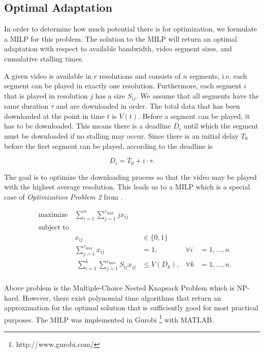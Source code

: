 \subsection{Optimal Adaptation}
\label{optadapt}

In order to determine how much potential there is for optimization, we formulate a MILP for this problem. 
The solution to the MILP will return an optimal adaptation with respect to available bandwidth, video segment sizes, and cumulative stalling times.

A given video is available in $r$ resolutions and consists of $n$ segments, i.e. each segment can be played in exactly one resolution. Furthermore, each segment $i$ that is played in resolution $j$ has a size $S_{ij}$. We assume that all segments have the same duration $\tau$ and are downloaded in order. The total data that has been downloaded at the point in time $t$ is $V(t)$. Before a segment can be played, it has to be downloaded. This means there is a deadline $D_i$ until which the segment must be downloaded if no stalling may occur. Since there is an initial delay $T_0$ before the first segment can be played, according to \cite{hossfeld2015identifying} the deadline is

\begin{equation}
D_i = T_0 + i\cdot \tau.
\end{equation}

The goal is to optimize the downloading process so that the video may be played with the highest average resolution. This leads us to a MILP which is a special case of \textit{Optimization Problem 2} from \cite{hossfeld2015identifying}.

\begin{align*}
& \text{maximize} & \sum_{i = 1}^{n} \sum_{j = 1}^{r_{\text{max}}} j x_{ij} &\\
& \text{subject to} & &&\\
&& x_{ij} &\in \{0,1\} &\\
&& \sum_{j = 1}^{r_{\text{max}}} x_{ij} &= 1, &\forall i&=1,\ldots,n \\
&& \phantom{\text{.}} \sum_{i=1}^{k} \sum_{j = 1}^{r_{\text{max}}} S_{ij} x_{ij} &\leq V(D_k), &\forall k&=1,\ldots,n \text{.} \\
\end{align*}

Above problem is the Multiple-Choice Nested Knapsack Problem which is NP-hard. However, there exist polynomial time algorithms that return an approximation for the optimal solution that is sufficiently good for most practical purposes. The MILP was implemented in Gurobi \footnote{http://www.gurobi.com/} with MATLAB.
